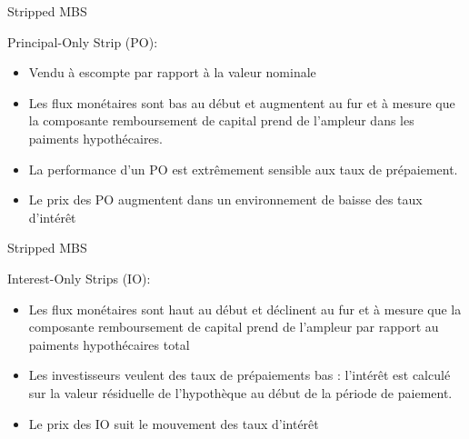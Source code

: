 \documentclass[10pt,a4paper]{beamer}
\begin{document}
\begin{frame}{Stripped MBS}
\begin{block}{Principal-Only Strip (PO):}
\begin{itemize}[label=\bullet]
\item Vendu à escompte par rapport à la valeur nominale
\vspace{0.3cm}
\item Les flux monétaires sont bas au début et augmentent au fur et à mesure que la composante remboursement de capital prend de l’ampleur dans les paiments hypothécaires.
\vspace{0.3cm}
\item La performance d’un PO est extrêmement sensible aux taux de prépaiement.
\vspace{0.3cm}
\item Le prix des PO augmentent dans un environnement de baisse des taux d’intérêt
\end{itemize}
\end{block}

\end{frame}


\begin{frame}{Stripped MBS}
\begin{block}{Interest-Only Strips (IO):}
\begin{itemize}[label=\bullet]
\item Les flux monétaires sont haut au début et déclinent au fur et à mesure que la composante remboursement de capital prend de l’ampleur par rapport au paiments hypothécaires total
\vspace{0.3cm}
\item Les investisseurs veulent des taux de prépaiements bas : l’intérêt est calculé sur la valeur résiduelle de l’hypothèque au début de la période de paiement.
\vspace{0.3cm}
\item Le prix des IO suit le mouvement des taux d’intérêt
\end{itemize}
\end{block}

\end{frame}
\end{document}
